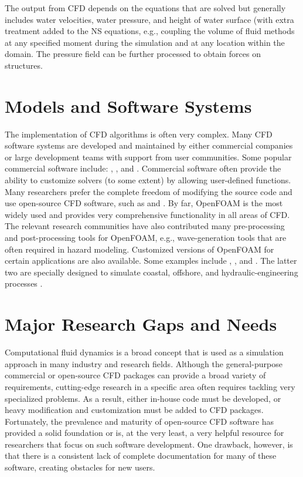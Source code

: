 The output from CFD depends on the equations that are solved but generally includes water velocities, water pressure, and height of water surface (with extra treatment added to the NS equations, e.g., coupling the volume of fluid methods \citep{Brackbill1992VOF, Hirt1981VOF, Jasak1996VOF, Ubbink1997VOF, Ubbink2002VOF} at any specified moment during the simulation and at any location within the domain. The pressure field can be further processed to obtain forces on structures.

\section{Models and Software Systems}
\label{sec:resp_cfd_water_methods}

The implementation of CFD algorithms is often very complex. Many CFD software systems are developed and maintained by either commercial companies or large development teams with support from user communities. Some popular commercial software include: , , and . Commercial software often provide the ability to customize solvers (to some extent) by allowing user-defined functions. Many researchers prefer the complete freedom of modifying the source code and use open-source CFD software, such as  and . By far, OpenFOAM is the most widely used and provides very comprehensive functionality in all areas of CFD. The relevant research communities have also contributed many pre-processing and post-processing tools for OpenFOAM, e.g., wave-generation tools that are often required in hazard modeling. Customized versions of OpenFOAM for certain applications are also available. Some examples include , , and . The latter two are specially designed to simulate coastal, offshore, and hydraulic-engineering processes \citep{Higuera2013OlaFlow, Higuera2013bOlaFlow, Higuera2014OlaFlow, Higuera2014bOlaFlow, Higuera2015OlaFlow}.

\section{Major Research Gaps and Needs}
\label{sec:resp_cfd_water_gaps}

Computational fluid dynamics is a broad concept that is used as a simulation approach in many industry and research fields. Although the general-purpose commercial or open-source CFD packages can provide a broad variety of requirements, cutting-edge research in a specific area often requires tackling very specialized problems. As a result, either in-house code must be developed, or heavy modification and customization must be added to CFD packages. Fortunately, the prevalence and maturity of open-source CFD software has provided a solid foundation or is, at the very least, a very helpful resource for researchers that focus on such software development.  One drawback, however, is that there is a consistent lack of complete documentation for many of these software, creating obstacles for new users.

